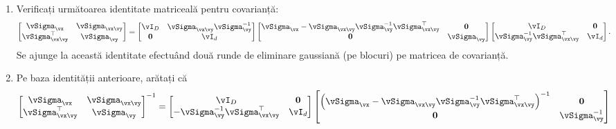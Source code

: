 \documentclass[../../book-main_ro.tex]{subfiles}
\begin{document}
\begin{exercise}
  \begin{enumerate}
    \item Verificați următoarea identitate matriceală pentru covarianță:
      \begin{equation}\label{eq:gaussian-conditional-covariance-block}
        \begin{bmatrix}
          \vSigma_{\vx} & \vSigma_{\vx\vy} \\
          \vSigma_{\vx\vy}^\top & \vSigma_{\vy}
        \end{bmatrix}
        =
        \begin{bmatrix}
          \vI_D & \vSigma_{\vx\vy}\vSigma_{\vy}^{-1} \\
          \Zero & \vI_d
        \end{bmatrix}
        \begin{bmatrix}
          \vSigma_{\vx} - \vSigma_{\vx\vy} \vSigma_{\vy}^{-1}
          \vSigma_{\vx\vy}^{\top} & \Zero \\
          \Zero & \vSigma_{\vy}
        \end{bmatrix}
        \begin{bmatrix}
          \vI_D & \Zero\\
          \vSigma_{\vy}^{-1}\vSigma_{\vx\vy}^\top & \vI_d
        \end{bmatrix}.
      \end{equation}
      Se ajunge la această identitate efectuând două runde de eliminare gaussiană (pe blocuri) pe matricea de covarianță.
    \item Pe baza identității anterioare, arătați că
      \begin{equation}\label{eq:gaussian-conditional-covariance-inverse-block}
        \begin{bmatrix}
          \vSigma_{\vx} & \vSigma_{\vx\vy} \\
          \vSigma_{\vx\vy}^\top & \vSigma_{\vy}
        \end{bmatrix}^{-1}
        =
        \begin{bmatrix}
          \vI_D & \Zero\\
          -\vSigma_{\vy}^{-1}\vSigma_{\vx\vy}^\top & \vI_d
        \end{bmatrix}
        \begin{bmatrix}
          \left(\vSigma_{\vx} - \vSigma_{\vx\vy} \vSigma_{\vy}^{-1}
          \vSigma_{\vx\vy}^{\top}\right)^{-1} & \Zero \\
          \Zero & \vSigma_{\vy}^{-1}
        \end{bmatrix}

\end{equation}
\end{enumerate}
\end{exercise}
\end{document}
